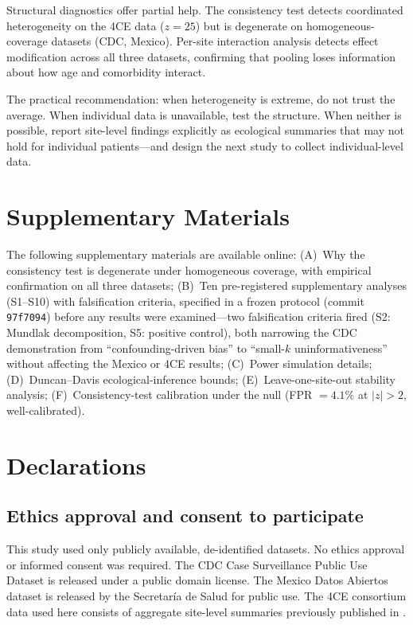 \documentclass[11pt]{article}
\begin{document}
Structural diagnostics offer partial help.  The consistency test detects
coordinated heterogeneity on the 4CE data ($z = 25$) but is degenerate on
homogeneous-coverage datasets (CDC, Mexico).  Per-site interaction analysis
detects effect modification across all three datasets, confirming that
pooling loses information about how age and comorbidity interact.

The practical recommendation: when heterogeneity is extreme, do not trust the
average.  When individual data is unavailable, test the structure.  When
neither is possible, report site-level findings explicitly as ecological
summaries that may not hold for individual patients---and design the next
study to collect individual-level data.


\appendix

\section{Supplementary Materials}
\label{app:supplementary}

The following supplementary materials are available online:
(A)~Why the consistency test is degenerate under homogeneous
coverage, with empirical confirmation on all three datasets;
(B)~Ten pre-registered supplementary
analyses (S1--S10) with falsification criteria, specified in a frozen
protocol (commit \texttt{97f7094}) before any results were examined---two
falsification criteria fired (S2: Mundlak decomposition, S5: positive
control), both narrowing the CDC demonstration from ``confounding-driven
bias'' to ``small-$k$ uninformativeness'' without affecting the Mexico
or 4CE results; (C)~Power simulation details;
(D)~Duncan--Davis ecological-inference bounds; (E)~Leave-one-site-out
stability analysis; (F)~Consistency-test calibration under the null
(FPR $= 4.1\%$ at $|z| > 2$, well-calibrated).


\section*{Declarations}

\subsection*{Ethics approval and consent to participate}
This study used only publicly available, de-identified datasets.  No
ethics approval or informed consent was required.  The CDC Case
Surveillance Public Use Dataset is released under a public domain license.
The Mexico Datos Abiertos dataset is released by the Secretar\'{i}a de
Salud for public use.  The 4CE consortium data used here consists of
aggregate site-level summaries previously published in
\citet{four_ce_neuro2021}.
\end{document}
